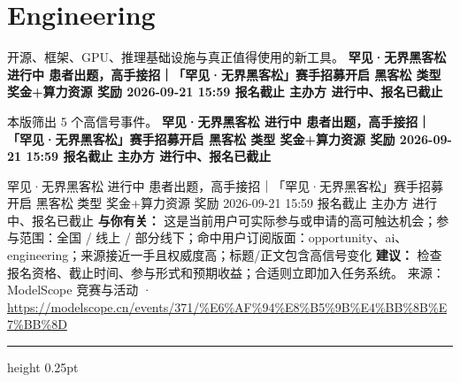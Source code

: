 \documentclass[10.5pt]{ctexart}
\begin{document}
\section*{Engineering}
{\color{ormuted} 开源、框架、GPU、推理基础设施与真正值得使用的新工具。}
\vspace{2mm}
{\LARGE\bfseries 罕见·无界黑客松 进行中 患者出题，高手接招｜「罕见·无界黑客松」赛手招募开启 黑客松 类型 奖金+算力资源 奖励 2026-09-21 15:59 报名截止 主办方 进行中、报名已截止}\par
\vspace{1mm}
{\color{ormuted} 本版筛出 5 个高信号事件。}
\vspace{3mm}
{\Large\bfseries 罕见·无界黑客松 进行中 患者出题，高手接招｜「罕见·无界黑客松」赛手招募开启 黑客松 类型 奖金+算力资源 奖励 2026-09-21 15:59 报名截止 主办方 进行中、报名已截止}\par
罕见·无界黑客松 进行中 患者出题，高手接招｜「罕见·无界黑客松」赛手招募开启 黑客松 类型 奖金+算力资源 奖励 2026-09-21 15:59 报名截止 主办方 进行中、报名已截止
\textbf{与你有关：} 这是当前用户可实际参与或申请的高可触达机会；参与范围：全国 / 线上 / 部分线下；命中用户订阅版面：opportunity、ai、engineering；来源接近一手且权威度高；标题/正文包含高信号变化
\textbf{建议：} 检查报名资格、截止时间、参与形式和预期收益；合适则立即加入任务系统。
{\footnotesize\color{ormuted} 来源：ModelScope 竞赛与活动 · \url{https://modelscope.cn/events/371/%E6%AF%94%E8%B5%9B%E4%BB%8B%E7%BB%8D}}
\vspace{4mm}
\hrule height 0.25pt
\vspace{3mm}
\end{document}
